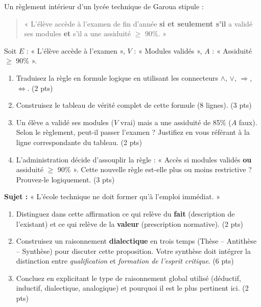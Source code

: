 \documentclass[11pt]{article}
\begin{document}
\begin{exercice}
Un règlement intérieur d'un lycée technique de Garoua stipule :
\begin{quote}
« L'élève accède à l'examen de fin d'année \textbf{si et seulement s'il} a validé ses modules \textbf{et} s'il a une assiduité $\ge$ 90\%. »
\end{quote}
Soit $E$ : « L'élève accède à l'examen », $V$ : « Modules validés », $A$ : « Assiduité $\ge$ 90\% ».
\begin{enumerate}
    \item Traduisez la règle en formule logique en utilisant les connecteurs $\land$, $\lor$, $\Rightarrow$, $\Leftrightarrow$. (2 pts)
    \item Construisez le tableau de vérité complet de cette formule (8 lignes). (3 pts)
    \item Un élève a validé ses modules ($V$ vrai) mais a une assiduité de 85\% ($A$ faux). Selon le règlement, peut-il passer l'examen ? Justifiez en vous référant à la ligne correspondante du tableau. (2 pts)
    \item L'administration décide d'assouplir la règle : « Accès si modules validés \textbf{ou} assiduité $\ge$ 90\% ». Cette nouvelle règle est-elle plus ou moins restrictive ? Prouvez-le logiquement. (3 pts)
\end{enumerate}
\end{exercice}

\begin{exercice}
\textbf{Sujet :} « L'école technique ne doit former qu'à l'emploi immédiat. »
\begin{enumerate}
    \item Distinguez dans cette affirmation ce qui relève du \textbf{fait} (description de l'existant) et ce qui relève de la \textbf{valeur} (prescription normative). (2 pts)
    \item Construisez un raisonnement \textbf{dialectique} en trois temps (Thèse -- Antithèse -- Synthèse) pour discuter cette proposition. Votre synthèse doit intégrer la distinction entre \textit{qualification} et \textit{formation de l'esprit critique}. (6 pts)
    \item Concluez en explicitant le type de raisonnement global utilisé (déductif, inductif, dialectique, analogique) et pourquoi il est le plus pertinent ici. (2 pts)
\end{enumerate}
\end{exercice}
\end{document}
